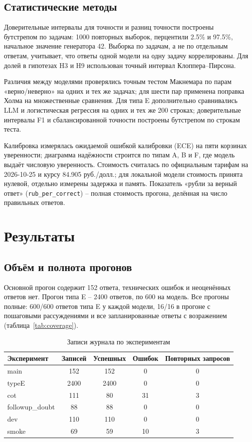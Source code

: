 \documentclass{bmstu}
\begin{document}
\section{Статистические методы}
Доверительные интервалы для точности и разниц точности построены бутстрепом по задачам: 1000 повторных выборок, перцентили 2.5\% и 97.5\%, начальное значение генератора 42. Выборка по задачам, а не по отдельным ответам, учитывает, что ответы одной модели на одну задачу коррелированы. Для долей в гипотезах H3 и H9 использован точный интервал Клоппера--Пирсона.

Различия между моделями проверялись точным тестом Макнемара по парам «верно/неверно» на одних и тех же задачах; для шести пар применена поправка Холма на множественные сравнения. Для типа E дополнительно сравнивались LLM и логистическая регрессия на одних и тех же 200 строках; доверительные интервалы F1 и сбалансированной точности построены бутстрепом по строкам теста.

Калибровка измерялась ожидаемой ошибкой калибровки (ECE) на пяти корзинах уверенности; диаграмма надёжности строится по типам A, B и F, где модель выдаёт числовую уверенность. Стоимость считалась по официальным тарифам на 2026-10-25 и курсу 84.905 руб./долл.; для локальной модели стоимость принята нулевой, отдельно измерены задержка и память. Показатель «рубли за верный ответ» (\texttt{rub\_per\_correct}) -- полная стоимость прогона, делённая на число правильных ответов.

\chapter{Результаты}
\label{ch:results}

\section{Объём и полнота прогонов}
Основной прогон содержит 152 ответа, технических ошибок и неоценённых ответов нет. Прогон типа E -- 2400 ответов, по 600 на модель. Все прогоны полные: 600/600 ответов типа E у каждой модели, 16/16 в прогоне с пошаговыми рассуждениями и все запланированные ответы с возражением (таблица~\ref{tab:coverage}).

\begin{table}[htbp]
\centering
\caption{Записи журнала по экспериментам}
\label{tab:calls}
\begin{tabular}{|l|c|c|c|c|}
\hline
Эксперимент & Записей & Успешных & Ошибок & Повторных запросов \\
\hline
main & 152 & 152 & 0 & 0 \\
typeE & 2400 & 2400 & 0 & 0 \\
cot & 111 & 80 & 31 & 3 \\
followup\_doubt & 88 & 88 & 0 & 0 \\
dev & 110 & 110 & 0 & 0 \\
smoke & 69 & 59 & 10 & 3 \\
\hline
\end{tabular}
\vspace{-10pt}
\end{table}
\end{document}
